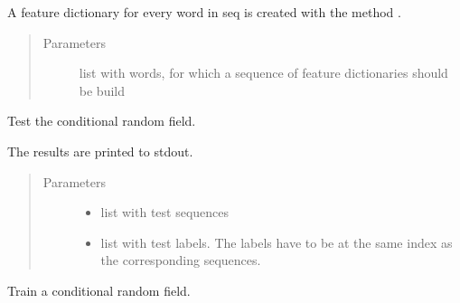 \documentclass[letterpaper,10pt,english]{sphinxmanual}
\begin{document}
\begin{fulllineitems}
\begin{fulllineitems}
A feature dictionary for every word in seq is created with the
method {\hyperref[\detokenize{api:product_crf.ProductnameCRF.create_features}]{}}.
\begin{quote}\begin{description}
\item[{Parameters}] \leavevmode
{} \textendash{} list with words, for which a sequence of feature
dictionaries should be build

\end{description}\end{quote}

\end{fulllineitems}


\begin{fulllineitems}
\label{\detokenize{api:product_crf.ProductnameCRF.test}}
Test the conditional random field.

The results are printed to stdout.
\begin{quote}\begin{description}
\item[{Parameters}] \leavevmode\begin{itemize}
\item {} 
 \textendash{} list with test sequences

\item {} 
 \textendash{} list with test labels. The labels have to be at the
same index as the corresponding sequences.

\end{itemize}

\end{description}\end{quote}

\end{fulllineitems}


\begin{fulllineitems}
\label{\detokenize{api:product_crf.ProductnameCRF.train}}
Train a conditional random field.


\end{fulllineitems}
\end{fulllineitems}
\end{document}

